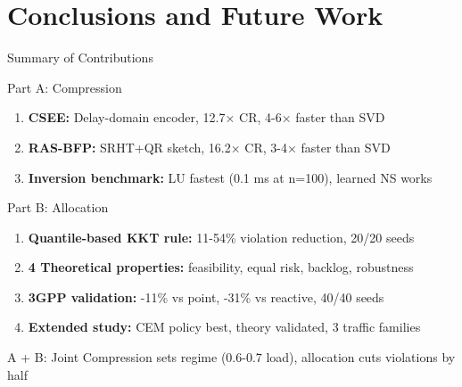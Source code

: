 \documentclass[aspectratio=169]{beamer}
\begin{document}
\section{Conclusions and Future Work}

\begin{frame}{Summary of Contributions}
\begin{block}{Part A: Compression}
\begin{enumerate}
    \item \textbf{CSEE:} Delay-domain encoder, 12.7× CR, 4-6× faster than SVD
    \item \textbf{RAS-BFP:} SRHT+QR sketch, 16.2× CR, 3-4× faster than SVD
    \item \textbf{Inversion benchmark:} LU fastest (0.1 ms at n=100), learned NS works
\end{enumerate}
\end{block}

\begin{block}{Part B: Allocation}
\begin{enumerate}
    \item \textbf{Quantile-based KKT rule:} 11-54\% violation reduction, 20/20 seeds
    \item \textbf{4 Theoretical properties:} feasibility, equal risk, backlog, robustness
    \item \textbf{3GPP validation:} -11\% vs point, -31\% vs reactive, 40/40 seeds
    \item \textbf{Extended study:} CEM policy best, theory validated, 3 traffic families
\end{enumerate}
\end{block}

\begin{block}{A + B: Joint}
Compression sets regime (0.6-0.7 load), allocation cuts violations by half
\end{block}
\end{frame}
\end{document}
